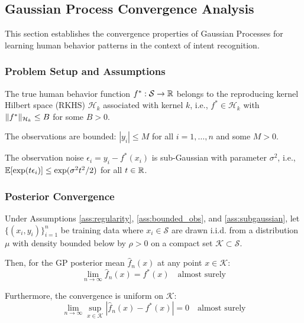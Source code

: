 \subsection{Gaussian Process Convergence Analysis}

This section establishes the convergence properties of Gaussian Processes for learning human behavior patterns in the context of intent recognition.

\subsubsection{Problem Setup and Assumptions}

\begin{assumption}
\label{ass:regularity}
The true human behavior function $f^* : \mathcal{S} \rightarrow \mathbb{R}$ belongs to the reproducing kernel Hilbert space (RKHS) $\mathcal{H}_k$ associated with kernel $k$, i.e., $f^* \in \mathcal{H}_k$ with $\lVert f^*\rVert_{\mathcal{H}_k} \leq B$ for some $B > 0$.
\end{assumption}

\begin{assumption}
\label{ass:bounded_obs}
The observations are bounded: $|y_i| \leq M$ for all $i = 1, \ldots, n$ and some $M > 0$.
\end{assumption}

\begin{assumption}
\label{ass:subgaussian}
The observation noise $\epsilon_i = y_i - f^*(x_i)$ is sub-Gaussian with parameter $\sigma^2$, i.e., $\operatorname{\mathbb{E}}[\exp(t\epsilon_i)] \leq \exp(\sigma^2 t^2/2)$ for all $t \in \mathbb{R}$.
\end{assumption}

\subsubsection{Posterior Convergence}

\begin{theorem}
\label{thm:gp_convergence}
Under Assumptions \ref{ass:regularity}, \ref{ass:bounded_obs}, and \ref{ass:subgaussian}, let $\{(x_i, y_i)\}_{i=1}^n$ be training data where $x_i \in \mathcal{S}$ are drawn i.i.d. from a distribution $\mu$ with density bounded below by $\rho > 0$ on a compact set $\mathcal{K} \subset \mathcal{S}$.

Then, for the GP posterior mean $\hat{f}_n(x)$ at any point $x \in \mathcal{K}$:
$$\lim_{n \to \infty} \hat{f}_n(x) = f^*(x) \quad \text{almost surely}$$

Furthermore, the convergence is uniform on $\mathcal{K}$:
$$\lim_{n \to \infty} \sup_{x \in \mathcal{K}} |\hat{f}_n(x) - f^*(x)| = 0 \quad \text{almost surely}$$
\end{theorem}

